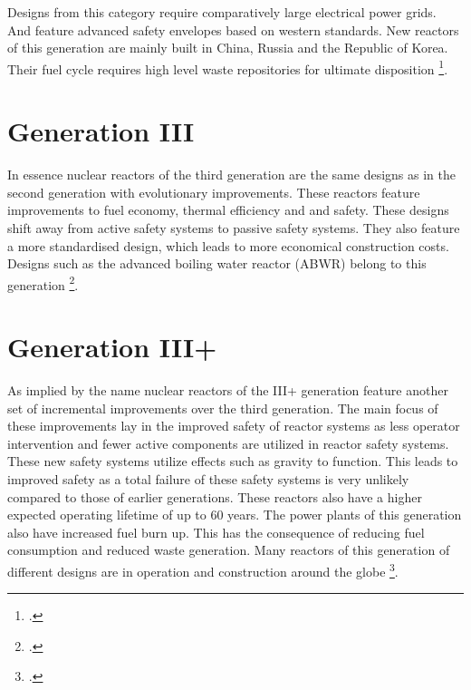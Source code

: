 Designs from this category require comparatively large electrical power grids. And feature advanced
safety envelopes based on western standards. New reactors of this generation are mainly built in
China, Russia and the Republic of Korea. Their fuel cycle requires high level waste repositories
for ultimate disposition \footcite[4-6]{Gen2gen}.
\section{Generation III}
In essence nuclear reactors of the third generation are the same designs as in the second generation
with evolutionary improvements. These reactors feature improvements to fuel economy, thermal efficiency and
and safety. These designs shift away from active safety systems to passive safety systems. They also
feature a more standardised design, which leads to more economical construction costs. Designs such
as the advanced boiling water reactor (ABWR) belong to this generation \footcite[5,6]{Gen2gen}.
\section{Generation III+}
As implied by the name nuclear reactors of the III+ generation feature another set of incremental improvements over the third
generation. The main focus of these improvements lay in the improved safety of reactor systems as
less operator intervention and fewer active components are utilized in reactor safety systems. These
new safety systems utilize effects such as gravity to function. This leads to improved safety as a
total failure of these safety systems is very unlikely compared to those of earlier generations.
These reactors also have a higher expected operating lifetime of up to 60 years. The power plants of
this generation also have increased fuel burn up. This has the consequence of reducing fuel consumption
and reduced waste generation. Many reactors of this generation of different designs are in operation
and construction around the globe \footcite[7-11]{Gen2gen}.